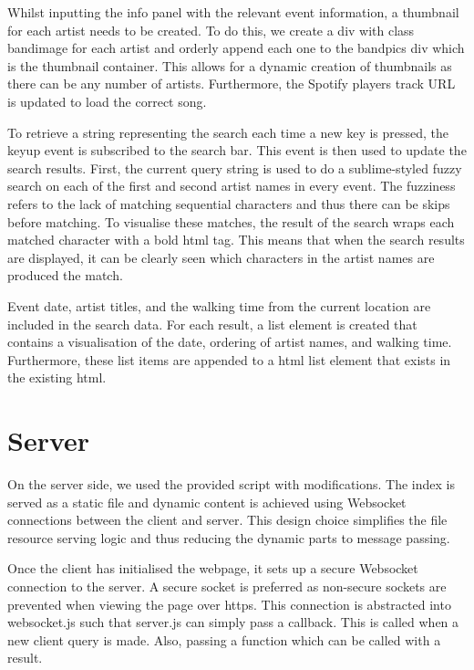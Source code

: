 \documentclass[10pt]{article}
\begin{document}
            Whilst inputting the info panel with the relevant event information, a thumbnail for each artist needs to be created. To do this, we create a div with class bandimage for each artist and orderly append each one to the bandpics div which is the thumbnail container. This allows for a dynamic creation of thumbnails  as there can be any number of artists. Furthermore, the Spotify player\textquotesingle s track URL is updated to load the correct song.

            To retrieve a string representing the search each time a new key is pressed, the keyup event is subscribed to the search bar. This event is then used to update the search results. First, the current query string is used to do a sublime-styled fuzzy search on each of the first and second artist names in every event. The fuzziness refers to the lack of matching sequential characters and thus there can be skips before matching. To visualise these matches, the result of the search wraps each matched character with a bold html tag. This means that when the search results are displayed, it can be clearly seen which characters in the artist names are produced the match.

            Event date, artist titles, and the walking time from the current location are included in the search data. For each result, a list element is created that contains a visualisation of the date, ordering of artist names, and walking time. Furthermore, these list items are appended to a html list element that exists in the existing html.

    \section{Server}
        On the server side, we used the provided script with modifications. The index is served as a static file and dynamic content is achieved using Websocket connections between the client and server. This design choice simplifies the file resource serving logic and thus reducing the dynamic parts to message passing.

        Once the client has initialised the webpage, it sets up a secure Websocket connection to the server. A secure socket is preferred as non-secure sockets are prevented when viewing the page over https. This connection is abstracted into websocket.js such that server.js can simply pass a callback.  This is called when a new client query is made. Also, passing a function which can be called with a result. 
\end{document}

